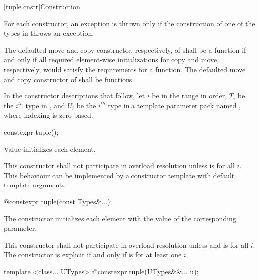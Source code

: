 [tuple.cnstr]{Construction}

\pnum
For each  constructor, an exception is thrown only if the construction of
one of the types in  throws an exception.

\pnum
The defaulted move and copy constructor, respectively, of
 shall be a  function if and only if all
required element-wise initializations for copy and move, respectively,
would satisfy the requirements for a  function. The
defaulted move and copy constructor of  shall be
 functions.

\pnum
In the constructor descriptions that follow, let $i$ be in the range
 in order, $T_i$ be the $i^{th}$ type in , and
$U_i$ be the $i^{th}$ type in a template parameter pack named , where indexing
is zero-based.

%
\begin{itemdecl}
constexpr tuple();
\end{itemdecl}

\begin{itemdescr}
\pnum
\effects Value-initializes each element.

\pnum
\remarks
This constructor shall not participate in overload resolution unless
 is  for all $i$.
\enternote This behaviour can be implemented by a constructor template
with default template arguments. \exitnote
\end{itemdescr}

%
\begin{itemdecl}
@\EXPLICIT@ constexpr tuple(const Types&...);
\end{itemdecl}

\begin{itemdescr}
\pnum
\effects The constructor initializes each element with the value of the
corresponding parameter.

\pnum
\remarks This constructor shall not participate in overload resolution unless
 and 
is  for all $i$. The constructor is explicit if and only if
 is 
for at least one $i$.
\end{itemdescr}

%
\begin{itemdecl}
template <class... UTypes>
  @\EXPLICIT@ constexpr tuple(UTypes&&... u);
\end{itemdecl}

